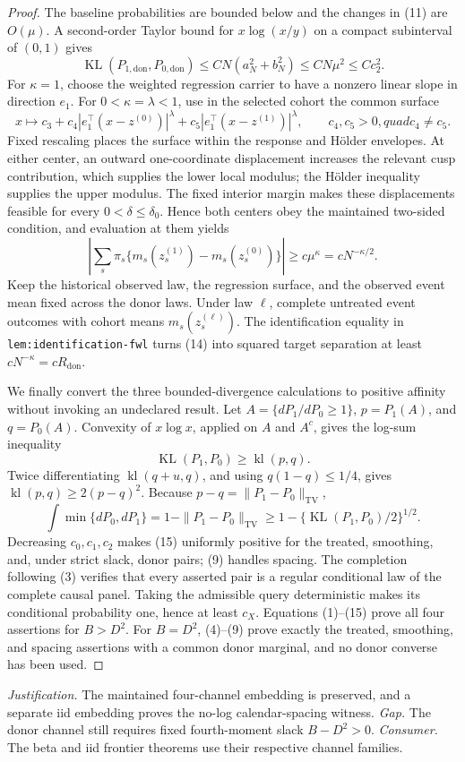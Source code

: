 \documentclass{article}
\begin{document}
\begin{proof}
The baseline probabilities are bounded below and the changes in (11) are \(O(\mu)\).  A second-order Taylor bound for \(x\log(x/y)\) on a compact subinterval of \((0,1)\) gives
\[
\operatorname{KL}(P_{1,\mathrm{don}},P_{0,\mathrm{don}})
\leq CN(a_N^2+b_N^2)
\leq CN\mu^2\leq Cc_2^2.
\tag{12}
\]
For \(\kappa=1\), choose the weighted regression carrier to have a nonzero linear slope in direction \(e_1\).  For \(0<\kappa=\lambda<1\), use in the selected cohort the common surface
\[
x\longmapsto c_3+c_4|e_1^\top(x-z^{(0)})|^\lambda
+c_5|e_1^\top(x-z^{(1)})|^\lambda,
\qquad c_4,c_5>0,quad c_4\ne c_5.
\tag{13}
\]
Fixed rescaling places the surface within the response and H\"older envelopes.  At either center, an outward one-coordinate displacement increases the relevant cusp contribution, which supplies the lower local modulus; the H\"older inequality supplies the upper modulus.  The fixed interior margin makes these displacements feasible for every \(0<\delta\leq\delta_0\).  Hence both centers obey the maintained two-sided condition, and evaluation at them yields
\[
\left|\sum_s\pi_s\{m_s(z_s^{(1)})-m_s(z_s^{(0)})\}\right|
\geq c\mu^\kappa=cN^{-\kappa/2}.
\tag{14}
\]
Keep the historical observed law, the regression surface, and the observed event mean fixed across the donor laws.  Under law \(\ell\), complete untreated event outcomes with cohort means \(m_s(z_s^{(\ell)})\).  The identification equality in \texttt{lem:identification-fwl} turns (14) into squared target separation at least \(cN^{-\kappa}=cR_{\mathrm{don}}\).

We finally convert the three bounded-divergence calculations to positive affinity without invoking an undeclared result.  Let \(A=\{dP_1/dP_0\geq1\}\), \(p=P_1(A)\), and \(q=P_0(A)\).  Convexity of \(x\log x\), applied on \(A\) and \(A^c\), gives the log-sum inequality
\[
\operatorname{KL}(P_1,P_0)\geq\operatorname{kl}(p,q).
\]
Twice differentiating \(\operatorname{kl}(q+u,q)\), and using \(q(1-q)\leq1/4\), gives
\(\operatorname{kl}(p,q)\geq2(p-q)^2\).  Because
\(p-q=\|P_1-P_0\|_{\mathrm{TV}}\),
\[
\int\min\{dP_0,dP_1\}
=1-\|P_1-P_0\|_{\mathrm{TV}}
\geq1-\{\operatorname{KL}(P_1,P_0)/2\}^{1/2}.
\tag{15}
\]
Decreasing \(c_0,c_1,c_2\) makes (15) uniformly positive for the treated, smoothing, and, under strict slack, donor pairs; (9) handles spacing.  The completion following (3) verifies that every asserted pair is a regular conditional law of the complete causal panel.  Taking the admissible query deterministic makes its conditional probability one, hence at least \(c_X\).  Equations (1)--(15) prove all four assertions for \(B>D^2\).  For \(B=D^2\), (4)--(9) prove exactly the treated, smoothing, and spacing assertions with a common donor marginal, and no donor converse has been used.
\end{proof}
\par\smallskip\noindent \textit{Justification.} The maintained four-channel embedding is preserved, and a separate iid embedding proves the no-log calendar-spacing witness. \textit{Gap.} The donor channel still requires fixed fourth-moment slack \(B-D^2>0\). \textit{Consumer.} The beta and iid frontier theorems use their respective channel families.
\end{document}
